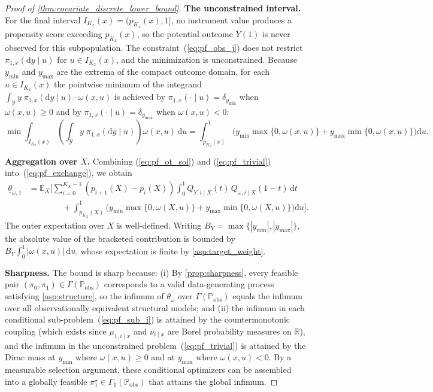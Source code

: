 \begin{proof}[Proof of \cref{thm:covariate_discrete_lower_bound}]
\medskip
\noindent\textbf{The unconstrained interval.}
For the final interval $I_{K_x}(x) = (p_{K_x}(x), 1]$, no instrument value produces a propensity score exceeding $p_{K_x}(x)$, so the potential outcome $Y(1)$ is never observed for this subpopulation. The constraint~(\ref{eq:pf_obs_j}) does not restrict $\pi_{1,x}(\mathrm{d}y \mid u)$ for $u \in I_{K_x}(x)$, and the minimization is unconstrained. Because $y_{\min}$ and $y_{\max}$ are the extrema of the compact outcome domain, for each $u \in I_{K_x}(x)$ the pointwise minimum of the integrand $\int_{\mathcal{Y}} y\;\pi_{1,x}(\mathrm{d}y \mid u)\cdot\omega(x,u)$ is achieved by $\pi_{1,x}(\cdot \mid u) = \delta_{y_{\min}}$ when $\omega(x,u) \geqslant 0$ and by $\pi_{1,x}(\cdot \mid u) = \delta_{y_{\max}}$ when $\omega(x,u) < 0$:
\begin{equation}\label{eq:pf_trivial}
    \min \int_{I_{K_x}(x)} \left(\int_{\mathcal{Y}} y\;\pi_{1,x}(\mathrm{d}y \mid u)\right)\omega(x,u)\,\mathrm{d}u = \int_{p_{K_x}(x)}^1 \Big(y_{\min}\max\{0,\omega(x,u)\} + y_{\max}\min\{0,\omega(x,u)\}\Big)\mathrm{d}u.
\end{equation}

\medskip
\noindent\textbf{Aggregation over $X$.}
Combining (\ref{eq:pf_ot_sol}) and (\ref{eq:pf_trivial}) into~(\ref{eq:pf_exchange}), we obtain
\begin{align*}
    \underline{\theta}_{\omega,1} &= \mathbb{E}_{X}\Big[\sum_{i=0}^{K_X-1} (p_{i+1}(X) - p_i(X)) \int_0^1 Q_{Y, i \mid X}(t)\,Q_{\omega, i \mid X}(1-t)\,\mathrm{d}t \\
    &\quad\quad\quad\quad+ \int_{p_{K_X}(X)}^1 \Big(y_{\min}\max\{0,\omega(X,u)\} + y_{\max}\min\{0,\omega(X,u)\}\Big)\mathrm{d}u\Big].
\end{align*}
The outer expectation over $X$ is well-defined. Writing $B_Y=\max\{|y_{\min}|,|y_{\max}|\}$, the absolute value of the bracketed contribution is bounded by $B_Y\int_0^1|\omega(x,u)|\,\mathrm du$, whose expectation is finite by \cref{asp:target_weight}.

\medskip
\noindent\textbf{Sharpness.}
The bound is sharp because: (i) By \cref{prop:sharpness}, every feasible pair $(\pi_0, \pi_1) \in \Gamma(\mathbb{P}_{\text{obs}})$ corresponds to a valid data-generating process satisfying \cref{asp:structure}, so the infimum of $\theta_\omega$ over $\Gamma(\mathbb{P}_{\text{obs}})$ equals the infimum over all observationally equivalent structural models; and (ii) the infimum in each conditional sub-problem~(\ref{eq:pf_sub_i}) is attained by the countermonotonic coupling (which exists since $\mu_{1,i\mid x}$ and $\nu_{i\mid x}$ are Borel probability measures on $\mathbb{R}$), and the infimum in the unconstrained problem~(\ref{eq:pf_trivial}) is attained by the Dirac mass at $y_{\min}$ where $\omega(x,u) \geqslant 0$ and at $y_{\max}$ where $\omega(x,u) < 0$. By a measurable selection argument, these conditional optimizers can be assembled into a globally feasible $\pi_1^\star \in \Gamma_1(\mathbb{P}_{\text{obs}})$ that attains the global infimum.
\end{proof}
\fi

